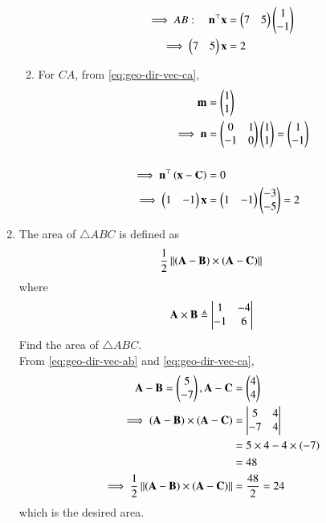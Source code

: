 \begin{enumerate}[label=\thesubsection.\arabic*.,ref=\thesubsection.\theenumi]
\begin{enumerate}
\begin{align}
	\implies
                AB: \quad  \mathbf{n}^{\top}\mathbf{x} &= \begin{pmatrix}7&5\end{pmatrix}\begin{pmatrix}1\\-1\end{pmatrix}\\    
       \implies\begin{pmatrix}7&5\end{pmatrix}\mathbf{x} &= 2
\end{align}
\item For 
$CA$, 
from 
		\eqref{eq:geo-dir-vec-ca}, 
\begin{align}
\mathbf{m} &= \begin{pmatrix}1 \\ 1\end{pmatrix}
\\
		\label{eq:geo-norm-vec-ca}
\implies \mathbf{n} 
&= \begin{pmatrix}0&1 \\ -1&0\end{pmatrix}\begin{pmatrix}1 \\ 1\end{pmatrix}
= \begin{pmatrix}1 \\ -1\end{pmatrix}\\
\\
\implies	\mathbf{n}^{\top}\left(	\mathbf{x}-\mathbf{C}\right) &= 0
\\
\implies \begin{pmatrix}1&-1\end{pmatrix}{\mathbf{x}} &= \begin{pmatrix}1&-1\end{pmatrix}\begin{pmatrix}-3 \\ -5\end{pmatrix} 
= 2 
\end{align}
\end{enumerate}

%
\item The area of $\triangle ABC$ is defined as
		\begin{align}
			\frac{1}{2}\left\lVert{\ensuremath{\left(\mathbf{A}-\mathbf{B}\right)}\times \ensuremath{\left(\mathbf{A}-\mathbf{C}\right)}}\right\rVert
		\end{align}
		where
		\begin{align}
			\mathbf{A}\times\mathbf{B} \triangleq \begin{vmatrix}1 & -4 \\-1 & 6\end{vmatrix}
		\end{align}
		Find the area of $\triangle ABC$.\\
\solution
From
		\eqref{eq:geo-dir-vec-ab}
		and
		\eqref{eq:geo-dir-vec-ca},
\begin{align}
	\mathbf{A}-\mathbf{B}=\begin{pmatrix}5\\-7\end{pmatrix},
	\mathbf{A}-\mathbf{C}&=\begin{pmatrix}4\\4\end{pmatrix}\\
\implies (\mathbf{A}-\mathbf{B})\times(\mathbf{A}-\mathbf{C}) &=\begin{vmatrix}5 & 4\\-7 & 4\end{vmatrix}\\
&=5\times 4-4\times (-7)\\&=48\\
\implies\frac{1}{2}\left\lVert(\mathbf{A}-\mathbf{B})\times(\mathbf{A}-\mathbf{C})\right\rVert&=\frac{48}{2}=24
\end{align}
which is the desired area.


\end{enumerate}
